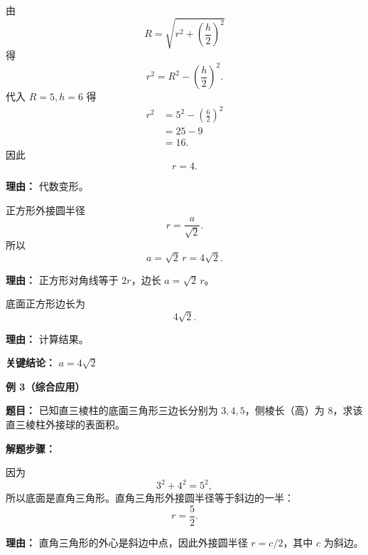 \begin{examplebox}
\begin{description}[style=nextline, leftmargin=2.8em, labelsep=0.5em, itemsep=0.45em]
		\item[\textbf{第二步（反求外接圆半径）：}]
		      由
		      \[
			      R = \sqrt{r^{2} + \left(\frac{h}{2}\right)^{2}}
		      \]
		      得
		      \[
			      r^{2} = R^{2} - \left(\frac{h}{2}\right)^{2}.
		      \]
		      代入 $R=5, h=6$ 得
		      \[
			      \begin{aligned}
				      r^{2} & = 5^{2} - \left(\frac{6}{2}\right)^{2} \\
				            & = 25 - 9                               \\
				            & = 16.
			      \end{aligned}
		      \]
		      因此
		      \[
			      r = 4.
		      \]
		      \par\textbf{理由：} 代数变形。

		\item[\textbf{第三步（正方形边长公式）：}]
		      正方形外接圆半径
		      \[
			      r = \frac{a}{\sqrt{2}}.
		      \]
		      所以
		      \[
			      a = \sqrt{2}\, r = 4\sqrt{2}.
		      \]
		      \par\textbf{理由：} 正方形对角线等于 $2r$，边长 $a = \sqrt{2}\, r$。

		\item[\textbf{第四步（给出答案）：}]
		      底面正方形边长为
		      \[
			      4\sqrt{2}.
		      \]
		      \par\textbf{理由：} 计算结果。
	\end{description}

	\textbf{\textcolor{CExample}{关键结论：}} \textbf{$a = 4\sqrt{2}$}

	\medskip
	\textbf{\textcolor{CExample}{例 3（综合应用）}}

	\textbf{\textcolor{CExample}{题目：}} 已知直三棱柱的底面三角形三边长分别为 $3,4,5$，侧棱长（高）为 $8$，求该直三棱柱外接球的表面积。

	\textbf{\textcolor{CExample}{解题步骤：}}
	\begin{description}[style=nextline, leftmargin=2.8em, labelsep=0.5em, itemsep=0.45em]
		\item[\textbf{第一步（求外接圆半径）：}]
		      因为
		      \[
			      3^{2}+4^{2}=5^{2},
		      \]
		      所以底面是直角三角形。直角三角形外接圆半径等于斜边的一半：
		      \[
			      r = \frac{5}{2}.
		      \]
		      \par\textbf{理由：} 直角三角形的外心是斜边中点，因此外接圆半径 $r=c/2$，其中 $c$ 为斜边。


\end{description}
\end{examplebox}
